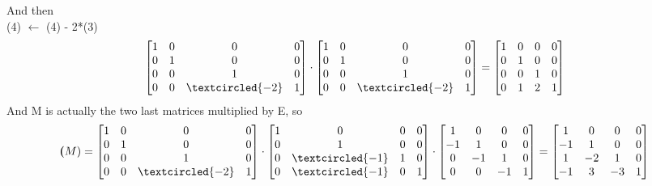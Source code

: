 \documentclass[a4paper,11pt]{article}
\newcommand{\mybf}[1]{\boldsymbol{#1}}
\begin{document}
And then \\
(4) $\leftarrow$ (4) - 2*(3)\\
\begin{align}
\begin{bmatrix} 
    1 & 0 & 0 & 0\\
    0 & 1 & 0 & 0\\
    0 & 0 & 1 & 0\\
    0 & 0 & \textcircled{-2} & 1\\ 
\end{bmatrix}
\cdot
\begin{bmatrix} 
    1 & 0 & 0 & 0\\
    0 & 1 & 0 & 0\\
    0 & 0 & 1 & 0\\
    0 & 0 & \textcircled{-2} & 1\\ 
\end{bmatrix}
=
\begin{bmatrix} 
    1 & 0 & 0 & 0\\
    0 & 1 & 0 & 0\\
    0 & 0 & 1 & 0\\
    0 & 1 & 2 & 1\\ 
\end{bmatrix}
\end{align}
And M is actually the two last matrices multiplied by E, so
\begin{align}
\mybf(M) =
\begin{bmatrix} 
    1 & 0 & 0 & 0\\
    0 & 1 & 0 & 0\\
    0 & 0 & 1 & 0\\
    0 & 0 & \textcircled{-2} & 1\\ 
\end{bmatrix}
\cdot
\begin{bmatrix} 
    1 & 0 & 0 & 0\\
    0 & 1 & 0 & 0\\
    0 & \textcircled{-1} & 1 & 0\\
    0 & \textcircled{-1} & 0 & 1\\ 
\end{bmatrix}
\cdot
\begin{bmatrix} 
    1 & 0 & 0 & 0\\
    -1 & 1 & 0 & 0\\
    0 & -1 & 1 & 0\\
    0 & 0 & -1 & 1\\ 
\end{bmatrix}
=
\begin{bmatrix} 
    1 & 0 & 0 & 0\\
    -1 & 1 & 0 & 0\\
    1 & -2 & 1 & 0\\
    -1 & 3 & -3 & 1\\ 
\end{bmatrix}
\end{align}
\end{document}
